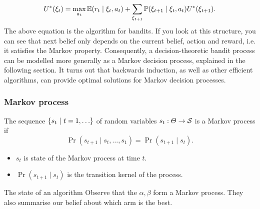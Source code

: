 \documentclass[9pt]{beamer}
\begin{document}
{  \begin{equation}
    U^*(\xi_t) = \max_{a_t} \mathop{\mbox{\ensuremath{\mathbb{E}}}}\nolimits(r_t \mid \xi_t, a_t) + \sum_{\xi_{t+1}} \mathop{\mbox{\ensuremath{\mathbb{P}}}}\nolimits(\xi_{t+1} \mid \xi_t, a_t) U^*(\xi_{t+1}).\label{eq:backwards-induction-bandits}
  \end{equation}
  The above equation is the  algorithm for bandits.  If you look at this structure, you can see that  next belief only depends on the current belief, action and reward, i.e. it satisfies the Markov property. Consequently, a decision-theoretic bandit process can be modelled more generally as a Markov decision process, explained in the following section. It turns out that backwards induction, as well as other efficient algorithms, can provide optimal solutions for Markov decision processes.
}


\begin{frame}
  \frametitle{Markov process}
  \begin{figure}
  \end{figure}

  \begin{definition}
    The sequence $\left\{s_t ~\middle|~ t=1,\ldots\right\}$ of random variables $s_t : \Theta \to {\mathcal{S}}$ is a Markov process if
    \begin{equation}
      \label{eq:markov-chain}
      \Pr(s_{t+1} \mid s_{t}, \ldots, s_1) 
      =
      \Pr(s_{t+1} \mid s_{t}). 
    \end{equation}
    \begin{itemize}
    \item $s_t$ is \alert{state} of the Markov process at
      time $t$.
    \item $\Pr(s_{t+1} \mid s_t)$ is the \alert{transition kernel} of the process.
    \end{itemize}
  \end{definition}
  
  \begin{alertblock}{The state of an algorithm}
    Observe that the $\alpha, \beta$ form a Markov process. They also summarise our belief about which arm is the best.
  \end{alertblock}
\end{frame}
\end{document}
